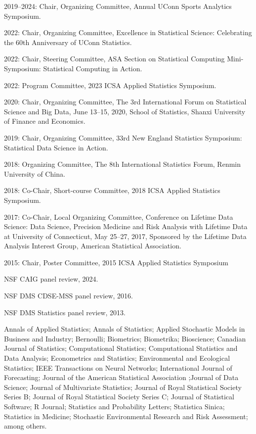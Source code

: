 \documentclass[Statistics]{vita}
\begin{document}
\begin{vita}
\begin{Services}
\begin{Conferences}
  \item 2019--2024: Chair, Organizing Committee, Annual UConn Sports Analytics Symposium.
  \item 2022: Chair, Organizing Committee, Excellence in Statistical Science: Celebrating the 60th Anniversary of UConn Statistics.
  \item 2022: Chair, Steering Committee, ASA Section on Statistical Computing Mini-Symposium: Statistical Computing in Action.
  \item 2022: Program Committee, 2023 ICSA Applied Statistics Symposium.
  \item 2020: Chair, Organizing Committee, The 3rd International Forum on Statistical Science and Big Data, June 13--15, 2020, School of Statistics, Shanxi University of Finance and Economics.
  \item 2019: Chair, Organizing Committee, 33rd New England Statistics Symposium: Statistical Data Science in Action.
  \item 2018: Organizing Committee, The 8th International Statistics Forum, Renmin University of China.
  \item 2018: Co-Chair, Short-course Committee, 2018 ICSA Applied Statistics Symposium.
  \item 2017: Co-Chair, Local Organizing Committee,  Conference on Lifetime Data Science: Data Science, Precision Medicine and Risk Analysis with Lifetime Data at University of Connecticut, May 25--27, 2017, Sponsored by the Lifetime Data Analysis Interest Group, American Statistical Association.
  \item 2015: Chair, Poster Committee, 2015 ICSA Applied Statistics Symposium
  \end{Conferences}
  \begin{GrantReviews}
  \item NSF CAIG panel review, 2024.
  \item NSF DMS CDSE-MSS panel review, 2016.
  \item NSF DMS Statistics panel review, 2013.
  \end{GrantReviews}
  \begin{JournalReviews}
  \item Annals of Applied Statistics; Annals of Statistics; Applied Stochastic Models in Business and Industry; Bernoulli; Biometrics; Biometrika; Bioscience; Canadian Journal of Statistics; Computational Statistics; Computational Statistics and Data Analysis; Econometrics and Statistics; Environmental and Ecological Statistics; IEEE Transactions on Neural Networks; International Journal of Forecasting; Journal of the American Statistical Association ;Journal of Data Science; Journal of Multivariate Statistics; Journal of Royal Statistical Society Series B; Journal of Royal Statistical Society Series C; Journal of Statistical Software; R Journal; Statistics and Probability Letters; Statistica Sinica; Statistics in Medicine; Stochastic Environmental Research and Risk Assessment; among others.

\end{JournalReviews}
\end{Services}
\end{vita}
\end{document}
